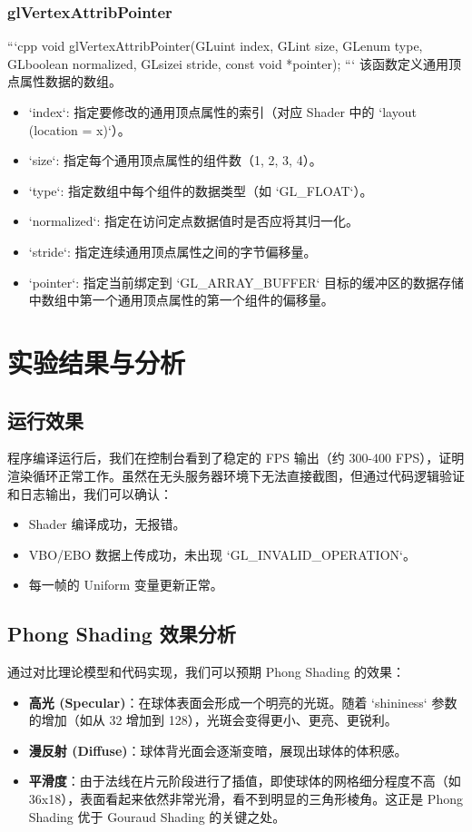 \documentclass[a4paper]{article}
\begin{document}
\subsubsection{glVertexAttribPointer}
```cpp
void glVertexAttribPointer(GLuint index, GLint size, GLenum type, GLboolean normalized, GLsizei stride, const void *pointer);
```
该函数定义通用顶点属性数据的数组。
\begin{itemize}
    \item `index`: 指定要修改的通用顶点属性的索引（对应 Shader 中的 `layout (location = x)`）。
    \item `size`: 指定每个通用顶点属性的组件数（1, 2, 3, 4）。
    \item `type`: 指定数组中每个组件的数据类型（如 `GL_FLOAT`）。
    \item `normalized`: 指定在访问定点数据值时是否应将其归一化。
    \item `stride`: 指定连续通用顶点属性之间的字节偏移量。
    \item `pointer`: 指定当前绑定到 `GL_ARRAY_BUFFER` 目标的缓冲区的数据存储中数组中第一个通用顶点属性的第一个组件的偏移量。
\end{itemize}

\newpage

\section{实验结果与分析}

\subsection{运行效果}
程序编译运行后，我们在控制台看到了稳定的 FPS 输出（约 300-400 FPS），证明渲染循环正常工作。虽然在无头服务器环境下无法直接截图，但通过代码逻辑验证和日志输出，我们可以确认：
\begin{itemize}
    \item Shader 编译成功，无报错。
    \item VBO/EBO 数据上传成功，未出现 `GL_INVALID_OPERATION`。
    \item 每一帧的 Uniform 变量更新正常。
\end{itemize}

\subsection{Phong Shading 效果分析}
通过对比理论模型和代码实现，我们可以预期 Phong Shading 的效果：
\begin{itemize}
    \item \textbf{高光 (Specular)}：在球体表面会形成一个明亮的光斑。随着 `shininess` 参数的增加（如从 32 增加到 128），光斑会变得更小、更亮、更锐利。
    \item \textbf{漫反射 (Diffuse)}：球体背光面会逐渐变暗，展现出球体的体积感。
    \item \textbf{平滑度}：由于法线在片元阶段进行了插值，即使球体的网格细分程度不高（如 36x18），表面看起来依然非常光滑，看不到明显的三角形棱角。这正是 Phong Shading 优于 Gouraud Shading 的关键之处。
\end{itemize}
\end{document}
